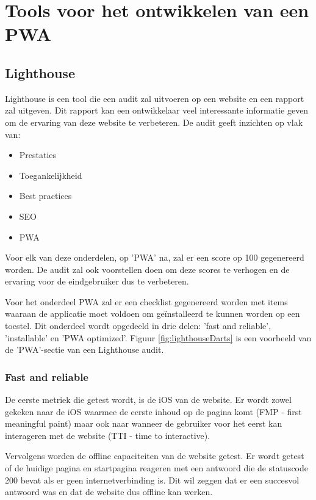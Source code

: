 \clearpage
\section{Tools voor het ontwikkelen van een PWA}


\subsection{Lighthouse}

	Lighthouse is een tool die een audit zal uitvoeren op een website en een rapport zal uitgeven. Dit rapport kan een ontwikkelaar veel interessante informatie geven om de ervaring van deze website te verbeteren. De audit geeft inzichten op vlak van:
	
	\begin{itemize}
		\item	Prestaties
		\item	Toegankelijkheid
		\item	Best practices
		\item	SEO
		\item   PWA
	\end{itemize}
	
	\autocite{Lighthouse2020}
	
	Voor elk van deze onderdelen, op 'PWA' na, zal er een score op 100 gegenereerd worden. De audit zal ook voorstellen doen om deze scores te verhogen en de ervaring voor de eindgebruiker dus te verbeteren.
	
	Voor het onderdeel PWA zal er een checklist gegenereerd worden met items waaraan de applicatie moet voldoen om geïnstalleerd te kunnen worden op een toestel. Dit onderdeel wordt opgedeeld in drie delen: 'fast and reliable', 'installable' en 'PWA optimized'. Figuur \ref{fig:lighthouseDarts} is een voorbeeld van de 'PWA'-sectie van een Lighthouse audit.
	
	
	\subsubsection{Fast and reliable}
		De eerste metriek die getest wordt, is de iOS van de website. Er wordt zowel gekeken naar de iOS waarmee de eerste inhoud op de pagina komt (FMP - first meaningful paint) maar ook naar wanneer de gebruiker voor het eerst kan interageren met de website (TTI - time to interactive).
		\autocite{web.dev2020}
		
		Vervolgens worden de offline capaciteiten van de website getest. Er wordt getest of de huidige pagina en startpagina reageren met een antwoord die de statuscode 200 bevat als er geen internetverbinding is. Dit wil zeggen dat er een succesvol antwoord was en dat de website dus offline kan werken.
	
